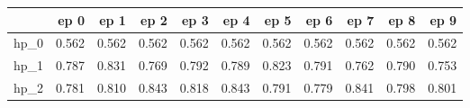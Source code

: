 \begin{tabular}{lrrrrrrrrrr}
\toprule
{} &   ep 0 &   ep 1 &   ep 2 &   ep 3 &   ep 4 &   ep 5 &   ep 6 &   ep 7 &   ep 8 &   ep 9 \\
\midrule
hp\_0 &  0.562 &  0.562 &  0.562 &  0.562 &  0.562 &  0.562 &  0.562 &  0.562 &  0.562 &  0.562 \\
hp\_1 &  0.787 &  0.831 &  0.769 &  0.792 &  0.789 &  0.823 &  0.791 &  0.762 &  0.790 &  0.753 \\
hp\_2 &  0.781 &  0.810 &  0.843 &  0.818 &  0.843 &  0.791 &  0.779 &  0.841 &  0.798 &  0.801 \\
\bottomrule
\end{tabular}
